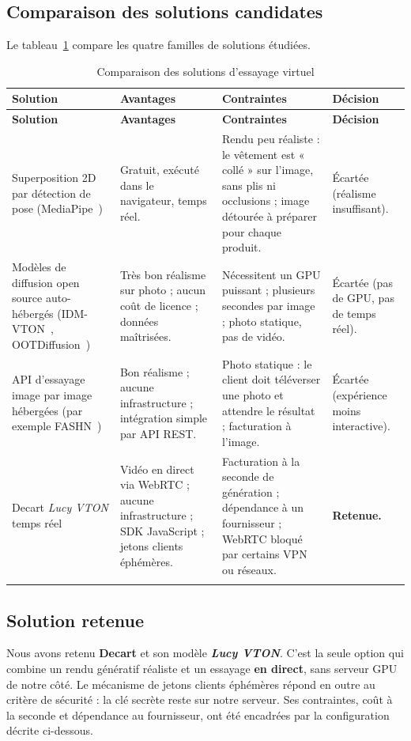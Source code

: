 \subsection{Comparaison des solutions candidates}
Le tableau~\ref{tab:comparaison-tryon} compare les quatre familles de solutions étudiées.
\renewcommand{\arraystretch}{1.4}
\begin{longtable}{|p{3.2cm}|p{4.2cm}|p{4.2cm}|p{2.6cm}|}
\hline
\textbf{Solution} & \textbf{Avantages} & \textbf{Contraintes} & \textbf{Décision} \\
\hline
\endfirsthead
\hline
\textbf{Solution} & \textbf{Avantages} & \textbf{Contraintes} & \textbf{Décision} \\
\hline
\endhead
Superposition 2D par détection de pose (MediaPipe~\cite{mediapipe}) &
Gratuit, exécuté dans le navigateur, temps réel. &
Rendu peu réaliste : le vêtement est « collé » sur l'image, sans plis ni occlusions ; image détourée à préparer pour chaque produit. &
Écartée (réalisme insuffisant). \\
\hline
Modèles de diffusion open source auto-hébergés (IDM-VTON~\cite{idmvton}, OOTDiffusion~\cite{ootdiffusion}) &
Très bon réalisme sur photo ; aucun coût de licence ; données maîtrisées. &
Nécessitent un GPU puissant ; plusieurs secondes par image ; photo statique, pas de vidéo. &
Écartée (pas de GPU, pas de temps réel). \\
\hline
API d'essayage image par image hébergées (par exemple FASHN~\cite{fashn}) &
Bon réalisme ; aucune infrastructure ; intégration simple par API REST. &
Photo statique : le client doit téléverser une photo et attendre le résultat ; facturation à l'image. &
Écartée (expérience moins interactive). \\
\hline
Decart \textit{Lucy VTON} temps réel~\cite{decart} &
Vidéo en direct via WebRTC ; aucune infrastructure ; SDK JavaScript ; jetons clients éphémères. &
Facturation à la seconde de génération ; dépendance à un fournisseur ; WebRTC bloqué par certains VPN ou réseaux. &
\textbf{Retenue.} \\
\hline
\caption{Comparaison des solutions d'essayage virtuel}
\label{tab:comparaison-tryon}
\end{longtable}

\subsection{Solution retenue}
Nous avons retenu \textbf{Decart} et son modèle \textbf{\textit{Lucy VTON}}. C'est la seule option qui combine un rendu génératif réaliste et un essayage \textbf{en direct}, sans serveur GPU de notre côté. Le mécanisme de jetons clients éphémères répond en outre au critère de sécurité : la clé secrète reste sur notre serveur. Ses contraintes, coût à la seconde et dépendance au fournisseur, ont été encadrées par la configuration décrite ci-dessous.

